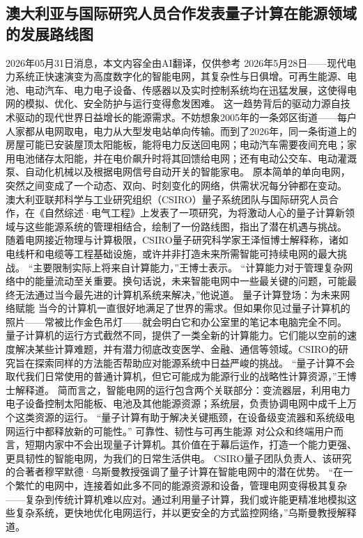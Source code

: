 \documentclass[12pt,a4paper]{ctexart}
\begin{document}
\subsection{ 澳大利亚与国际研究人员合作发表量子计算在能源领域的发展路线图 }

2026年05月31日消息，本文内容全由AI翻译，仅供参考
2026年5月28日——现代电力系统正快速演变为高度数字化的智能电网，其复杂性与日俱增。可再生能源、电池、电动汽车、电力电子设备、传感器以及实时控制系统均在迅猛发展，这使得电网的模拟、优化、安全防护与运行变得愈发困难。
这一趋势背后的驱动力源自技术驱动的现代世界日益增长的能源需求。不妨想象2005年的一条郊区街道——每户人家都从电网取电，电力从大型发电站单向传输。而到了2026年，同一条街道上的房屋可能已安装屋顶太阳能板，能将电力反送回电网；电动汽车需要夜间充电；家用电池储存太阳能，并在电价飙升时将其回馈给电网；还有电动公交车、电动灌溉泵、自动化机械以及根据电网信号自动开关的智能家电。
原本简单的单向电网，突然之间变成了一个动态、双向、时刻变化的网络，供需状况每分钟都在变动。
澳大利亚联邦科学与工业研究组织（CSIRO）量子系统团队与国际研究人员合作，在《自然综述·电气工程》上发表了一项研究，为将激动人心的量子计算新领域与这些能源系统的管理相结合，绘制了一份路线图，指出了潜在机遇与挑战。
随着电网接近物理与计算极限，CSIRO量子研究科学家王泽恒博士解释称，诸如电线杆和电缆等工程基础设施，或许并非打造未来所需智能可持续电网的最大挑战。
“主要限制实际上将来自计算能力，”王博士表示。
“计算能力对于管理复杂网络中的能量流动至关重要。换句话说，未来智能电网中一些最关键的问题，可能最终无法通过当今最先进的计算机系统来解决，”他说道。
量子计算登场：为未来网络赋能
当今的计算机一直很好地满足了世界的需求。但如果你见过量子计算机的照片——常被比作金色吊灯——就会明白它和办公室里的笔记本电脑完全不同。
量子计算机的运行方式截然不同，提供了一类全新的计算能力。它们能以空前的速度解决某些计算难题，并有潜力彻底改变医学、金融、通信等领域。CSIRO的研究旨在探索同样的方法能否帮助应对能源系统中日益严峻的挑战。
“量子计算不会取代我们日常使用的普通计算机，但它可能成为能源行业的战略性计算资源，”王博士解释道。
简而言之，智能电网的运行包含两个关联部分：变流器层，利用电力电子设备控制太阳能板、电池及其他能源资源；系统层，负责协调电网中成千上万个这类资源的运行。
“量子计算有助于解决关键瓶颈，在设备级变流器和系统级电网运行中都释放新的可能性。”
可靠性、韧性与可再生能源
对公众和终端用户而言，短期内家中不会出现量子计算机。其价值在于幕后运作，打造一个能力更强、更具韧性的智能电网，为我们的日常生活供电。
CSIRO量子团队负责人、该研究的合著者穆罕默德·乌斯曼教授强调了量子计算在智能电网中的潜在优势。
“在一个繁忙的电网中，连接着如此多不同的能源资源和设备，管理电网变得极其复杂——复杂到传统计算机难以应对。通过利用量子计算，我们或许能更精准地模拟这些复杂系统，更快地优化电网运行，并以更安全的方式监控网络，”乌斯曼教授解释道。
\end{document}
